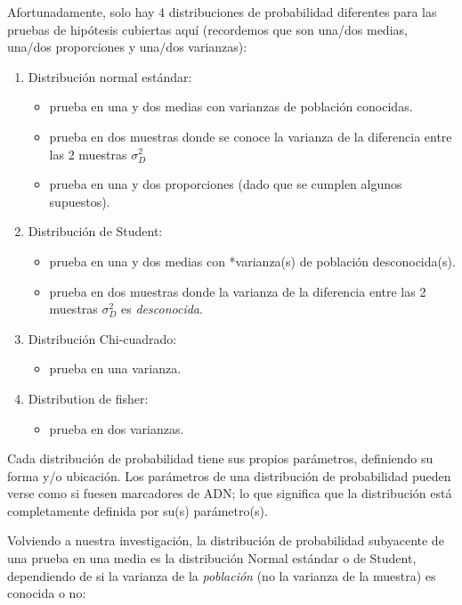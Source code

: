 \documentclass[
]{book}
\providecommand{\tightlist}{%
  \setlength{\itemsep}{0pt}\setlength{\parskip}{0pt}}
\begin{document}
Afortunadamente, solo hay 4 distribuciones de probabilidad diferentes para las pruebas de hipótesis cubiertas aquí (recordemos que son una/dos medias, una/dos proporciones y una/dos varianzas):

\begin{enumerate}
\def\labelenumi{\arabic{enumi}.}
\tightlist
\item
  Distribución normal estándar:

  \begin{itemize}
  \tightlist
  \item
    prueba en una y dos medias con varianzas de población conocidas.
  \item
    prueba en dos muestras donde se conoce la varianza de la diferencia entre las 2 muestras \(\sigma^2_D\)
  \item
    prueba en una y dos proporciones (dado que se cumplen algunos supuestos).
  \end{itemize}
\item
  Distribución de Student:

  \begin{itemize}
  \tightlist
  \item
    prueba en una y dos medias con *varianza(s) de población desconocida(s).
  \item
    prueba en dos muestras donde la varianza de la diferencia entre las 2 muestras \(\sigma^2_D\) es \emph{desconocida}.
  \end{itemize}
\item
  Distribución Chi-cuadrado:

  \begin{itemize}
  \tightlist
  \item
    prueba en una varianza.
  \end{itemize}
\item
  Distribution de fisher:

  \begin{itemize}
  \tightlist
  \item
    prueba en dos varianzas.
  \end{itemize}
\end{enumerate}

Cada distribución de probabilidad tiene sus propios parámetros, definiendo su forma y/o ubicación. Los parámetros de una distribución de probabilidad pueden verse como si fuesen marcadores de ADN; lo que significa que la distribución está completamente definida por su(s) parámetro(s).

Volviendo a nuestra investigación, la distribución de probabilidad subyacente de una prueba en una media es la distribución Normal estándar o de Student, dependiendo de si la varianza de la \emph{población} (no la varianza de la muestra) es conocida o no:
\end{document}
